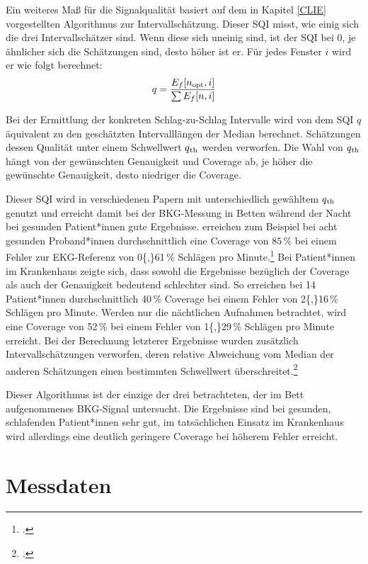 	Ein weiteres Maß für die Signalqualität basiert auf dem in Kapitel \ref{CLIE} vorgestellten Algorithmus zur Intervallschätzung. Dieser \acl{SQI} misst, wie einig sich die drei Intervallschätzer sind. Wenn diese sich uneinig sind, ist der \ac{SQI} bei 0, je ähnlicher sich die Schätzungen sind, desto höher ist er. Für jedes Fenster $i$ wird er wie folgt berechnet: \[ q = \frac{E_f[n\textsubscript{opt}, i]}{\sum E_f[n, i]} \] %
	
	Bei der Ermittlung der konkreten Schlag-zu-Schlag Intervalle wird von dem \ac{SQI} $q$ äquivalent zu den geschätzten Intervalllängen der Median berechnet. Schätzungen dessen Qualität unter einem Schwellwert $q\textsubscript{th}$ werden verworfen. Die Wahl von $q\textsubscript{th}$ hängt von der gewünschten Genauigkeit und Coverage ab, je höher die gewünschte Genauigkeit, desto niedriger die Coverage.
	
	Dieser \ac{SQI} wird in verschiedenen Papern mit unterschiedlich gewähltem $q\textsubscript{th}$ genutzt und erreicht damit bei der \ac{BKG}-Messung in Betten während der Nacht bei gesunden Patient*innen gute Ergebnisse. \citeauthor{Bruser2013} erreichen zum Beispiel bei acht gesunden Proband*innen durchschnittlich eine Coverage von $85\,\%$ bei einem Fehler zur \ac{EKG}-Referenz von \num{0{,}61}\,\% Schlägen pro Minute.\footcite[Vgl.][]{Bruser2013} Bei Patient*innen im Krankenhaus zeigte sich, dass sowohl die Ergebnisse bezüglich der Coverage als auch der Genauigkeit bedeutend schlechter sind. So erreichen \citeauthor{HoogAntink2020} bei 14 Patient*innen durchschnittlich \num{40}\,\% Coverage bei einem Fehler von \num{2{,}16}\,\% Schlägen pro Minute. Werden nur die nächtlichen Aufnahmen betrachtet, wird eine Coverage von \num{52}\,\% bei einem Fehler von \num{1{,}29}\,\% Schlägen pro Minute erreicht. Bei der Berechnung letzterer Ergebnisse wurden zusätzlich Intervallschätzungen verworfen, deren relative Abweichung vom Median der anderen Schätzungen einen bestimmten Schwellwert überschreitet.\footcite[Vgl.][]{HoogAntink2020}
	
	Dieser Algorithmus ist der einzige der drei betrachteten, der im Bett aufgenommenes \ac{BKG}-Signal untersucht. Die Ergebnisse sind bei gesunden, schlafenden Patient*innen sehr gut, im tatsächlichen Einsatz im Krankenhaus wird allerdings eine deutlich geringere Coverage bei höherem Fehler erreicht.
	
\section{Messdaten}

